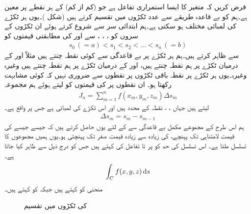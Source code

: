 فرض کریں کہ  متغیر  کا ایسا استمراری تفاعل ہے  جو (کم از کم)  کے ہر نقطے پر معین ہے۔ہم  کو بے قاعدہ طریقے سے  عدد ٹکڑوں میں تقسیم کرتے ہیں (شکل )۔یوں ہر ٹکڑے کی لمبائی مختلف ہو سکتی ہے۔ہم ابتدائی سر سے شروع کرتے ہوئے ان ٹکڑوں کے سروں کو ، ، ،   سے اور  کی مطابقتی قیمتوں کو
\begin{align*}
s_0\,(=a)<s_1<s_2<\dots<s_n\,(=b)
\end{align*}
سے ظاہر کرتے ہیں۔ہم ہر ٹکڑے پر بے قاعدگی سے کوئی نقطہ چنتے ہیں مثلاً  اور  کے درمیان ٹکڑے پر ہم نقطہ  چنتے ہیں،  اور  کے درمیان ٹکڑے پر ہم نقطہ  چنتے ہیں وغیرہ وغیرہ۔یوں ہر ٹکڑے پر نقطہ باقی ٹکڑوں پر نقطوں سے ضروری نہیں کہ کوئی مشابہت رکھتا ہو۔ ان نقطوں پر  کی قیمتوں کو لیتے ہوئے ہم مجموعہ
\begin{align*}
J_n=\sum_{m=1}^{n} f(x_m,y_m,z_m)\Delta s_m
\end{align*}
لیتے ہیں جہاں ، ،  نقطہ  کے محدد ہیں اور  اس ٹکڑے کی لمبائی ہے جس پر  واقع ہے۔
\begin{align*}
\Delta s_m=s_m-s_{m-1}
\end{align*}
ہم اس طرح کے مجموعے مکمل بے قاعدگی سے  کے لئے یوں حاصل کرتے ہیں کہ جیسے جیسے  کی قیمت لامتناہی تک پہنچے،  کی زیادہ سے زیادہ قیمت صفر تک پہنچتی ہو۔یوں ہمیں مجموعوں کا تسلسل  ملتا ہے۔ اس تسلسل کی حد کو  پر  تا  تفاعل  کی  کہتے ہیں جس کو درج ذیل سے ظاہر کیا جاتا ہے۔
\begin{align*}
\int_C f(x,y,z)\dif s
\end{align*}
منحنی  کو  کہتے ہیں جبکہ  کو  کہتے ہیں۔
%
\begin{figure}
\centering
{}
\caption{ کی ٹکڑوں میں تقسیم}
\label{شکل_سمتی_تکمل_راہ_کی_تقسیم}
\end{figure}

